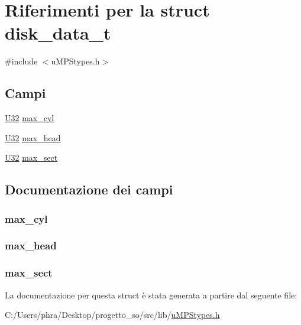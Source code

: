 \hypertarget{structdisk__data__t}{\section{Riferimenti per la struct disk\-\_\-data\-\_\-t}
\label{structdisk__data__t}
}


{\ttfamily \#include $<$u\-M\-P\-Stypes.\-h$>$}

\subsection*{Campi}
\begin{DoxyCompactItemize}
\item 
\hyperlink{base_8h_ac3df7cf3c8cb172a588adec881447d68}{U32} \hyperlink{structdisk__data__t_aeb8030b3dd1287feefb6380f4c8e3611}{max\-\_\-cyl}
\item 
\hyperlink{base_8h_ac3df7cf3c8cb172a588adec881447d68}{U32} \hyperlink{structdisk__data__t_aa6c7020fb3ea2240307fe8cef518f4a0}{max\-\_\-head}
\item 
\hyperlink{base_8h_ac3df7cf3c8cb172a588adec881447d68}{U32} \hyperlink{structdisk__data__t_ab583dd23c9c85bbeacf54b11d8d59a28}{max\-\_\-sect}
\end{DoxyCompactItemize}


\subsection{Documentazione dei campi}
\hypertarget{structdisk__data__t_aeb8030b3dd1287feefb6380f4c8e3611}{
\subsubsection[{max\-\_\-cyl}]{ max\-\_\-cyl}}\label{structdisk__data__t_aeb8030b3dd1287feefb6380f4c8e3611}
\hypertarget{structdisk__data__t_aa6c7020fb3ea2240307fe8cef518f4a0}{
\subsubsection[{max\-\_\-head}]{ max\-\_\-head}}\label{structdisk__data__t_aa6c7020fb3ea2240307fe8cef518f4a0}
\hypertarget{structdisk__data__t_ab583dd23c9c85bbeacf54b11d8d59a28}{
\subsubsection[{max\-\_\-sect}]{ max\-\_\-sect}}\label{structdisk__data__t_ab583dd23c9c85bbeacf54b11d8d59a28}


La documentazione per questa struct è stata generata a partire dal seguente file\-:\begin{DoxyCompactItemize}
\item 
C\-:/\-Users/phra/\-Desktop/progetto\-\_\-so/src/lib/\hyperlink{u_m_p_stypes_8h}{u\-M\-P\-Stypes.\-h}\end{DoxyCompactItemize}
